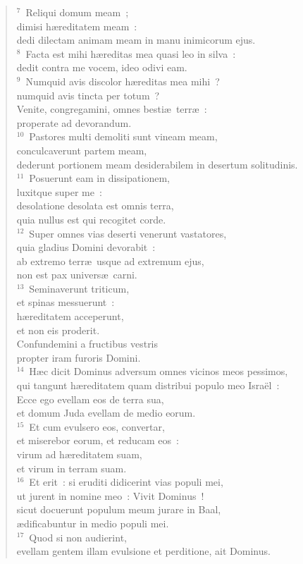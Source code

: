 \begin{verse}${}^{7}$~Reliqui domum meam~;\\ dimisi h\ae reditatem meam~:\\ dedi dilectam animam meam in manu inimicorum ejus.\\
${}^{8}$~Facta est mihi h\ae reditas mea quasi leo in silva~:\\ dedit contra me vocem, ideo odivi eam.\\
${}^{9}$~Numquid avis discolor h\ae reditas mea mihi~?\\ numquid avis tincta per totum~?\\ Venite, congregamini, omnes besti\ae\ terr\ae~:\\ properate ad devorandum.\\
${}^{10}$~Pastores multi demoliti sunt vineam meam,\\ conculcaverunt partem meam,\\ dederunt portionem meam desiderabilem in desertum solitudinis.\\
${}^{11}$~Posuerunt eam in dissipationem,\\ luxitque super me~:\\ desolatione desolata est omnis terra,\\ quia nullus est qui recogitet corde.\\
${}^{12}$~Super omnes vias deserti venerunt vastatores,\\ quia gladius Domini devorabit~:\\ ab extremo terr\ae\ usque ad extremum ejus,\\ non est pax univers\ae\ carni.\\
${}^{13}$~Seminaverunt triticum,\\ et spinas messuerunt~:\\ h\ae reditatem acceperunt,\\ et non eis proderit.\\ Confundemini a fructibus vestris\\ propter iram furoris Domini.\\
${}^{14}$~H\ae c dicit Dominus adversum omnes vicinos meos pessimos,\\ qui tangunt h\ae reditatem quam distribui populo meo Isra\"el~:\\ Ecce ego evellam eos de terra sua,\\ et domum Juda evellam de medio eorum.\\
${}^{15}$~Et cum evulsero eos, convertar,\\ et miserebor eorum, et reducam eos~:\\ virum ad h\ae reditatem suam,\\ et virum in terram suam.\\
${}^{16}$~Et erit~: si eruditi didicerint vias populi mei,\\ ut jurent in nomine meo~: Vivit Dominus~!\\ sicut docuerunt populum meum jurare in Baal,\\ \ae dificabuntur in medio populi mei.\\
${}^{17}$~Quod si non audierint,\\ evellam gentem illam evulsione et perditione, ait Dominus.\end{verse}
